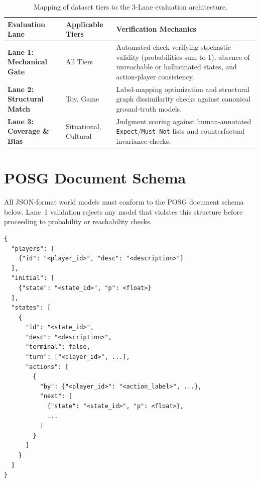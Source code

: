 \documentclass{article}
\begin{document}
\begin{table}[t]
\centering
\small
\caption{Mapping of dataset tiers to the 3-Lane evaluation architecture.}
\begin{tabularx}{\textwidth}{llX}
\toprule
\textbf{Evaluation Lane} & \textbf{Applicable Tiers} & \textbf{Verification Mechanics} \\ 
\midrule
\textbf{Lane 1: Mechanical Gate} & All Tiers & Automated check verifying stochastic validity (probabilities sum to 1), absence of unreachable or hallucinated states, and action-player consistency. \\ 
\addlinespace
\textbf{Lane 2: Structural Match} & Toy, Game & Label-mapping optimization and structural graph dissimilarity checks against canonical ground-truth models. \\ 
\addlinespace
\textbf{Lane 3: Coverage \& Bias} & Situational, Cultural & Judgment scoring against human-annotated \texttt{Expect}/\texttt{Must-Not} lists and counterfactual invariance checks. \\ 
\bottomrule
\end{tabularx}
\label{tab:evaluation_lanes}
\end{table}

\section{POSG Document Schema}
\label{sec:json_schema}

All JSON-format world models must conform to the POSG document schema below.
Lane~1 validation rejects any model that violates this structure before proceeding
to probability or reachability checks.

\begin{samepage}
\begin{lstlisting}[basicstyle=\ttfamily\small, breaklines=true, frame=single]
{
  "players": [
    {"id": "<player_id>", "desc": "<description>"}
  ],
  "initial": [
    {"state": "<state_id>", "p": <float>}
  ],
  "states": [
    {
      "id": "<state_id>",
      "desc": "<description>",
      "terminal": false,
      "turn": ["<player_id>", ...],
      "actions": [
        {
          "by": {"<player_id>": "<action_label>", ...},
          "next": [
            {"state": "<state_id>", "p": <float>},
            ...
          ]
        }
      ]
    }
  ]
}
\end{lstlisting}
\end{samepage}
\end{document}
